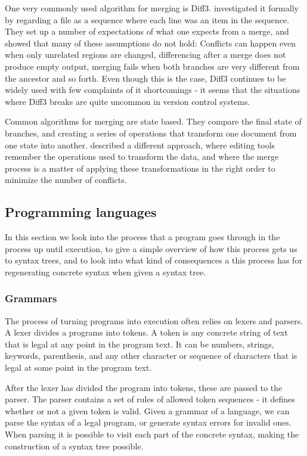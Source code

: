 \documentclass[11pt]{article}
\begin{document}
One very commonly used algorithm for merging is Diff3. \citet{Khanna} investigated it formally by regarding a file as a sequence where each line was an item in the sequence. They set up a number of expectations of what one expects from a merge, and showed that many of these assumptions do not hold: Conflicts can happen even when only unrelated regions are changed, differencing after a merge does not produce empty output, merging fails when both branches are very different from the ancestor and so forth. Even though this is the case, Diff3 continues to be widely used with few complaints of it shortcomings - it seems that the situations where Diff3 breaks are quite uncommon in version control systems.

Common algorithms for merging are state based. They compare the final state of branches, and creating a series of operations that transform one document from one state into another. \citet{Lippe} described a different approach, where editing tools remember the operations used to transform the data, and where the merge process is a matter of applying these transformations in the right order to minimize the number of conflicts.



\subsection{Programming languages}
In this section we look into the process that a program goes through in the process up until execution, to give a simple overview of how this process gets us to syntax trees, and to look into what kind of consequences a this process has for regenerating concrete syntax when given a syntax tree.

\subsubsection{Grammars}
The process of turning programs into execution often relies on lexers and parsers. A lexer divides a programs into tokens. A token is any concrete string of text that is legal at any point in the program text. It can be numbers, strings, keywords, parenthesis, and any other character or sequence of characters that is legal at some point in the program text. 

After the lexer has divided the program into tokens, these are passed to the parser. The parser contains a set of rules of allowed token sequences - it defines whether or not a given token is valid. Given a grammar of a language, we can parse the syntax of a legal program, or generate syntax errors for invalid ones. When parsing it is possible to visit each part of the concrete syntax, making the construction of a syntax tree possible.
\end{document}
